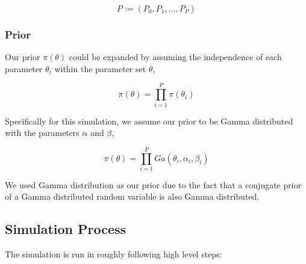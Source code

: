 \documentclass{bioinfo}
\begin{document}
\begin{equation}
P := (P_0, P_1, \dots , P_P)\label{eq:08}
\end{equation}

\subsubsection{Prior}

Our prior $\pi(\theta)$ could be expanded by assuming the independence of each parameter $\theta_i$ within the parameter set $\theta$,

\begin{equation}
\pi(\theta) = \prod_{i=1}^{P} \pi(\theta_i)\label{eq:09}
\end{equation}

Specifically for this simulation, we assume our prior to be Gamma distributed with the parameters $\alpha$ and $\beta$,

\begin{equation}
\pi(\theta) = \prod_{i=1}^{P} Ga(\theta_i, \alpha_i, \beta_i)\label{eq:10}
\end{equation}

We used Gamma distribution as our prior due to the fact that a conjugate prior of a Gamma distributed random variable is also Gamma distributed.

\subsection{Simulation Process}

The simulation is run in roughly following high level steps:
\end{document}

